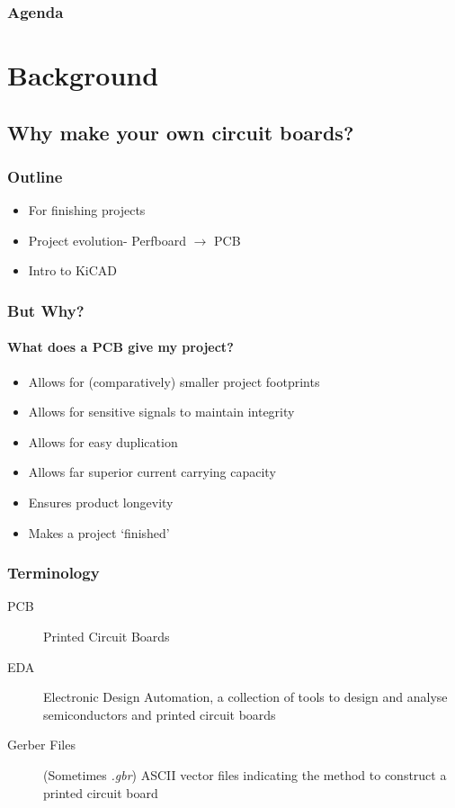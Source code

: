 \documentclass[]{beamer}
\begin{document}
\begin{frame}[plain]
    \frametitle{Agenda}
    \tableofcontents
\end{frame}

\section[Background]{Background}
\subsection[But Why?]{Why make your own circuit boards?}
\begin{frame}
    \frametitle{\insertsection{} Outline}
    \begin{itemize}
        \item For finishing projects
        \item Project evolution- Perfboard $\rightarrow{}$ PCB
        \item Intro to KiCAD
    \end{itemize}
\end{frame}

\begin{frame}
    \frametitle{But Why?}
    \framesubtitle{What does a PCB give my project?}
    \begin{itemize}[<+->]
        \item{Allows for (comparatively) smaller project footprints}
        \item{Allows for sensitive signals to maintain integrity}
        \item{Allows for easy duplication}
        \item{Allows far superior current carrying capacity}
        \item{Ensures product longevity}
        \item{Makes a project `finished'}
    \end{itemize}
\end{frame}

\begin{frame}
    \frametitle{Terminology}
    \begin{description}
        \item[PCB]{Printed Circuit Boards}
        \item[EDA]{Electronic Design Automation, a collection of tools to design
            and analyse semiconductors and printed circuit boards}
        \item[Gerber Files]{(Sometimes \emph{.gbr}) ASCII vector files indicating the method
            to construct a printed circuit board}
    \end{description}
\end{frame}
\end{document}
